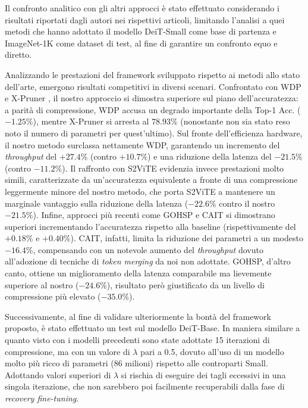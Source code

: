 Il confronto analitico con gli altri approcci è stato effettuato considerando i risultati riportati dagli autori nei rispettivi articoli, limitando l'analisi a quei metodi che hanno adottato il modello DeiT-Small come base di partenza e ImageNet-1K come dataset di test, al fine di garantire un confronto equo e diretto. \par

Analizzando le prestazioni del framework sviluppato rispetto ai metodi allo stato dell'arte, emergono risultati competitivi in diversi scenari. Confrontato con WDP \cite{yu2022width} e X-Pruner \cite{yu2023xprunerexplainablepruningvision}, il nostro approccio si dimostra superiore sul piano dell'accuratezza: a parità di compressione, WDP accusa un degrado importante della Top-1 Acc. ($-1.25\%$), mentre X-Pruner si arresta al $78.93\%$ (nonostante non sia stato reso noto il numero di parametri per quest'ultimo). Sul fronte dell'efficienza hardware, il nostro metodo surclassa nettamente WDP, garantendo un incremento del \textit{throughput} del $+27.4\%$ (contro $+10.7\%$) e una riduzione della latenza del $-21.5\%$ (contro $-11.2\%$). Il raffronto con S2ViTE \cite{chen2021chasingsparsityvisiontransformers} evidenzia invece prestazioni molto simili, caratterizzate da un'accuratezza equivalente a fronte di una compressione leggermente minore del nostro metodo, che porta S2ViTE a mantenere un marginale vantaggio sulla riduzione della latenza ($-22.6\%$ contro il nostro $-21.5\%$). Infine, approcci più recenti come GOHSP \cite{yin2023gohspunifiedframeworkgraph} e CAIT \cite{wang2025caittriplewincompressionhigh} si dimostrano superiori incrementando l'accuratezza rispetto alla baseline (rispettivamente del $+0.18\%$ e $+0.40\%$). CAIT, infatti, limita la riduzione dei parametri a un modesto $-16.4\%$, compensando con un notevole aumento del \textit{throughput} dovuto all'adozione di tecniche di \textit{token merging} da noi non adottate. GOHSP, d'altro canto, ottiene un miglioramento della latenza comparabile ma lievemente superiore al nostro ($-24.6\%$), risultato però giustificato da un livello di compressione più elevato ($-35.0\%$).

Successivamente, al fine di validare ulteriormente la bontà del framework proposto, è stato effettuato un test sul modello DeiT-Base. In maniera similare a quanto visto con i modelli precedenti sono state adottate 15 iterazioni di compressione, ma con un valore di $\lambda$ pari a 0.5, dovuto all'uso di un modello molto più ricco di parametri (86 milioni) rispetto alle controparti Small. 
Adottando valori superiori di $\lambda$ si rischia di eseguire dei tagli eccessivi in una singola iterazione, che non sarebbero poi facilmente recuperabili dalla fase di \textit{recovery fine-tuning}. 



